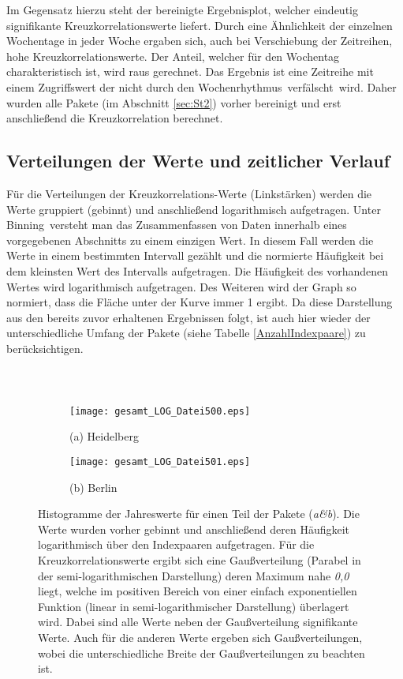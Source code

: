 \documentclass[fontsize=11pt, twoside, a4paper]{scrartcl}
\begin{document}
Im Gegensatz hierzu steht der bereinigte Ergebnisplot, welcher eindeutig signifikante Kreuzkorrelationswerte liefert. Durch eine Ähnlichkeit der einzelnen Wochentage in jeder Woche ergaben sich, auch bei Verschiebung der Zeitreihen, hohe Kreuzkorrelationswerte. Der Anteil, welcher für den Wochentag charakteristisch ist, wird raus gerechnet. Das Ergebnis ist eine Zeitreihe mit einem Zugriffswert der nicht durch den Wochenrhythmus \,\glqq verfälscht\grqq\, wird.
Daher wurden alle Pakete (im Abschnitt \ref{sec:St2}) vorher bereinigt und erst anschließend die Kreuzkorrelation berechnet.

\subsection{Verteilungen der Werte und zeitlicher Verlauf}
\label{sec:St5}
Für die Verteilungen der Kreuzkorrelations-Werte (Linkstärken) werden die Werte gruppiert (\glqq gebinnt\grqq) und anschließend logarithmisch aufgetragen. Unter \glqq Binning\grqq\, versteht man das Zusammenfassen von Daten innerhalb eines vorgegebenen Abschnitts zu einem einzigen Wert. In diesem Fall werden die Werte in einem bestimmten Intervall gezählt und die normierte Häufigkeit bei dem kleinsten Wert des Intervalls aufgetragen. Die Häufigkeit des vorhandenen Wertes wird logarithmisch aufgetragen. Des Weiteren wird der Graph so normiert, dass die Fläche unter der Kurve immer 1 ergibt. Da diese Darstellung aus den bereits zuvor erhaltenen Ergebnissen folgt, ist auch hier wieder der unterschiedliche Umfang der Pakete (siehe Tabelle \ref{AnzahlIndexpaare}) zu berücksichtigen.
\begin{verbatim}



\end{verbatim}
\begin{figure}[hbtp]
\centering
	\begin{minipage}[t]{0.45\textwidth}
		\begin{figure}[H]
		\texttt{[image: gesamt\_LOG\_Datei500.eps]}
		\caption*{(a) Heidelberg}
		\end{figure}
	\end{minipage}
	\begin{minipage}[t]{0.45\textwidth}
		\begin{figure}[H]
		\texttt{[image: gesamt\_LOG\_Datei501.eps]}
		\caption*{(b) Berlin}
		\end{figure}
	\end{minipage}	
\caption{Histogramme der Jahreswerte für einen Teil der Pakete (\textit{a\&b}). Die Werte wurden vorher gebinnt und anschließend deren Häufigkeit logarithmisch über den Indexpaaren aufgetragen. Für die Kreuzkorrelationswerte ergibt sich eine Gaußverteilung (Parabel in der semi-logarithmischen Darstellung) deren Maximum nahe \textit{0,0} liegt, welche im positiven Bereich von einer einfach exponentiellen Funktion (linear in semi-logarithmischer Darstellung) überlagert wird. Dabei sind alle Werte neben der Gaußverteilung signifikante Werte. Auch für die anderen Werte ergeben sich Gaußverteilungen, wobei die unterschiedliche Breite der Gaußverteilungen zu beachten ist.}	
\label{Abb8}
\end{figure}
\end{document}
